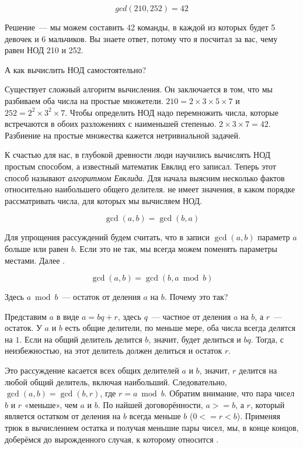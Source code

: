 $$
gcd(210, 252) = 42
$$

Решение~--- мы можем составить 42 команды, в каждой из которых будет 5 девочек и 6 мальчиков.
Вы знаете ответ, потому что я посчитал за вас, чему равен НОД 210 и 252.

А как вычислить НОД самостоятельно?

Существует сложный алгоритм вычисления.
Он заключается в том, что мы разбиваем оба числа на простые множетели.
$210 = 2 \times 3 \times 5 \times 7$ и $252 = 2^2 \times 3^2 \times 7$.
Чтобы определить НОД надо перемножить числа, которые встречаются в обоих разложениях с наименьшей степенью.
$2 \times 3 \times 7 = 42$.
Разбиение на простые множества кажется нетривиальной задачей.

К счастью для нас, в глубокой древности люди научились вычислять НОД простым способом, а известный математик Евклид его записал.
Теперь этот способ называют {\em алгоритмом Евклида}.
Для начала выясним несколько фактов относительно наибольшего общего делителя.
 не имеет значения, в каком порядке рассматривать числа, для которых мы вычисляем НОД.

$$
\gcd(a, b) = \gcd(b, a)
$$

Для упрощения рассуждений будем считать, что в записи $\gcd(a, b)$ параметр $a$ больше или равен $b$.
Если это не так, мы всегда можем поменять параметры местами.
Далее .

$$
\gcd(a, b) = \gcd(b, a \bmod b)
$$

Здесь $a \bmod b$~--- остаток от деления $a$ на $b$.
Почему это так?

Представим $a$ в виде $a = b q + r$, здесь $q$~--- частное от деления $a$ на $b$, а $r$~--- остаток.
У $a$ и $b$ есть общие делители, по меньше мере, оба числа всегда делятся на $1$.
Если на общий делитель делится $b$, значит, будет делиться и $b q$.
Тогда, с неизбежностью, на этот делитель должен делиться и остаток $r$.

Это рассуждение касается всех общих делителей $a$ и $b$, значит, $r$ делится на любой общий делитель, включая наибольший.
Следовательно, $\gcd(a, b) = \gcd(b, r)$, где $r = a \bmod b$.
Обратим внимание, что пара чисел $b$ и $r$ «меньше», чем $a$ и $b$.
По найшей договорённости, $a >= b$, а $r$, который является остатком от деления на $b$ всегда меньше $b$ ($0 <= r < b$).
Применяя трюк в вычислением остатка и получая меньшие пары чисел, мы, в конце концов, доберёмся до вырожденного случая, к которому относится .

